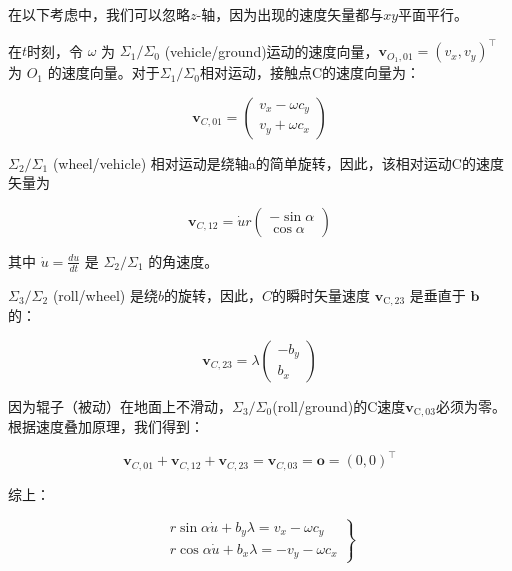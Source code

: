 在以下考虑中，我们可以忽略$z$-轴，因为出现的速度矢量都与$x y$平面平行。

在$t$时刻，令 $\omega$ 为 $\Sigma_{1} / \Sigma_{0}$ (vehicle/ground)运动的速度向量，$\mathbf{v}_{O_{1}, 01}=\left(v_{x}, v_{y}\right)^{\top}$ 为 $O_{1}$ 的速度向量。对于$\Sigma_{1} / \Sigma_{0}$相对运动，接触点C的速度向量为：

\begin{equation}
\mathbf{v}_{C, 01}=\left(\begin{array}{c}
{v_{x}-\omega c_{y}} \\
{v_{y}+\omega c_{x}}
\end{array}\right)
\end{equation}

$\Sigma_{2} / \Sigma_{1}$ (wheel/vehicle) 相对运动是绕轴a的简单旋转，因此，该相对运动C的速度矢量为


\begin{equation}
    \mathbf{v}_{C, 12}=\dot{u} r\left(\begin{array}{c}
    {-\sin \alpha} \\
    {\cos \alpha}
    \end{array}\right)
\end{equation}

其中 $\dot{u}=\frac{d u}{d t}$ 是 $\Sigma_{2} / \Sigma_{1}$ 的角速度。

$\Sigma_{3} / \Sigma_{2}$ (roll/wheel) 是绕$b$的旋转，因此，$C$的瞬时矢量速度 $\mathbf{v}_{\mathrm{C}, 23}$ 是垂直于 $\mathbf{b}$ 的：

\begin{equation}
\mathbf{v}_{C, 23}=\lambda\left(\begin{array}{c}
{-b_{y}} \\
{b_{x}}
\end{array}\right)
\end{equation}

因为辊子（被动）在地面上不滑动，$\Sigma_{3} / \Sigma_{0}$(roll/ground)的C速度$\mathbf{v}_{\mathrm{C}, 03}$必须为零。根据速度叠加原理，我们得到：

\begin{equation}
    \mathbf{v}_{C, 01}+\mathbf{v}_{C, 12}+\mathbf{v}_{C, 23}=\mathbf{v}_{C, 03}=\mathbf{o}=(0,0)^{\top}
\end{equation}

综上：

\begin{equation}
    \left.\begin{array}{l}
    {r \sin \alpha \dot{u}+b_{y} \lambda=v_{x}-\omega c_{y}} \\
    {r \cos \alpha \dot{u}+b_{x} \lambda=-v_{y}-\omega c_{x}}
    \end{array}\right\}
\end{equation}

